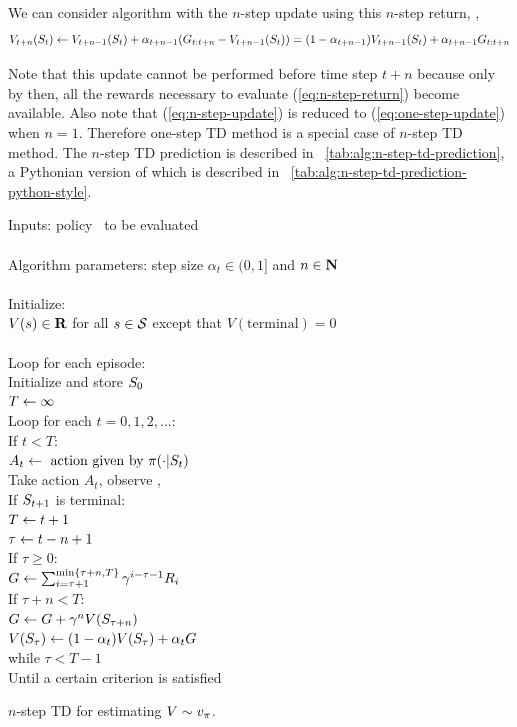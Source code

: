 We can consider algorithm with the $n$-step update using this $n$-step return, \ie,
\begin{equation}
\label{eq:n-step-update}
V_{t+n}(S_{t}) \leftarrow V_{t+n-1}(S_{t}) + \alpha_{t+n-1} (G_{{t}:{t+n}} - V_{t+n-1}(S_{t}))
= (1-\alpha_{t+n-1}) V_{t+n-1}(S_{t}) + \alpha_{t+n-1} G_{{t}:{t+n}}
\end{equation}

Note that this update cannot be performed before time step $t+n$ because only by then, all the rewards necessary to evaluate (\ref{eq:n-step-return})
become available. Also note that (\ref{eq:n-step-update}) is reduced to (\ref{eq:one-step-update}) when $n=1$.
Therefore one-step TD method is a special case of $n$-step TD method.
The $n$-step TD prediction is described in \tablename~\ref{tab:alg:n-step-td-prediction},
a Pythonian version of which is described in \tablename~\ref{tab:alg:n-step-td-prediction-python-style}.



\begin{table}
\beginalg
Inputs: policy \pol\ to be evaluated\\
\\
Algorithm parameters: step size $\alpha_t \in (0, 1]$ and $n\in{\mbox{\bf N}}$\\
\\
Initialize:\\
\> $V(s)\in\mathbf{R}$ for all $s\in\mathcal{S}$ except that $V(\mathrm{terminal})=0$\\
\\
Loop for each episode:\\
\> Initialize and store $S_{0}$\\
\> $T \leftarrow \infty$\\
\> Loop for each $t=0,1,2,\ldots$:\\
\> \> If $t<T$:\\
\> \> \> $A_t \leftarrow \mbox{ action given by } \pi(\cdot|S_{t})$\\
\> \> \> Take action $A_t$, observe , \\
\> \> \> If $S_{t+1}$ is terminal:\\
\> \> \> \> $T \leftarrow t+1$\\
\> \> $\tau \leftarrow t-n+1$\\
\> \> If $\tau \geq 0$:\\
\> \> \> $G \leftarrow \sum_{i=\tau+1}^{\min\{\tau+n,T\}} \gamma^{i-\tau-1} R_{i}$\\
\> \> \> If $\tau+n < T$:\\
\> \> \> \> $G \leftarrow G + \gamma^{n} V(S_{\tau+n})$\\
\> \> \> $V(S_{\tau}) \leftarrow (1-\alpha_{t}) V(S_{\tau}) + \alpha_{t} G$\\
\> while $\tau<T-1$\\
Until a certain criterion is satisfied
\endalg
\caption{$n$-step TD for estimating $V\sim v_{\pi}$.}
\label{tab:alg:n-step-td-prediction}
\end{table}



